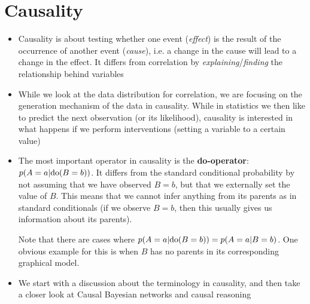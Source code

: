 \section{Causality}
\begin{itemize}
	\item Causality is about testing whether one event (\textit{effect}) is the result of the occurrence of another event (\textit{cause}), i.e. a change in the cause will lead to a change in the effect. It differs from correlation by \textit{explaining}/\textit{finding} the relationship behind variables
	\item While we look at the data distribution for correlation, we are focusing on the generation mechanism of the data in causality. While in statistics we then like to predict the next observation (or its likelihood), causality is interested in what happens if we perform interventions (setting a variable to a certain value)
	\item The most important operator in causality is the \textbf{do-operator}: $p(A=a|\textnormal{do}(B=b))$. It differs from the standard conditional probability by not assuming that we have observed $B=b$, but that we externally set the value of $B$. This means that we cannot infer anything from its parents as in standard conditionals (if we observe $B=b$, then this usually gives us information about its parents).
	
	Note that there are cases where $p(A=a|\textnormal{do}(B=b))=p(A=a|B=b)$. One obvious example for this is when $B$ has no parents in its corresponding graphical model.
	\item We start with a discussion about the terminology in causality, and then take a closer look at Causal Bayesian networks and causal reasoning
\end{itemize}
